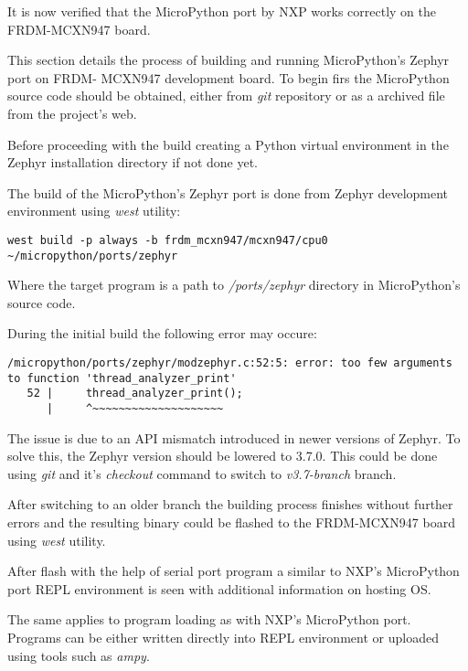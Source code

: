 \documentclass[twoside, 12pt]{article}
\begin{document}
It is now verified that the MicroPython port by NXP works correctly on the FRDM-MCXN947 board.


This section details the process of building and running MicroPython's Zephyr port on FRDM-
MCXN947 development board. To begin firs the MicroPython source code should be obtained, 
either from \textit{git} repository or as a archived file from the project's web.

Before proceeding with the build creating a Python virtual environment in the Zephyr 
installation directory if not done yet.

The build of the MicroPython's Zephyr port is done from Zephyr development environment using \textit{west} utility:
\begin{lstlisting}[caption=Building MicroPython's Zephyr port, breaklines=true]
west build -p always -b frdm_mcxn947/mcxn947/cpu0 ~/micropython/ports/zephyr
\end{lstlisting}
Where the target program is a path to \textit{/ports/zephyr} directory in MicroPython's source
code.

During the initial build the following error may occure:
\begin{lstlisting}[caption=Error building MicroPython's Zephyr port,breaklines=true]
/micropython/ports/zephyr/modzephyr.c:52:5: error: too few arguments to function 'thread_analyzer_print'
   52 |     thread_analyzer_print();
      |     ^~~~~~~~~~~~~~~~~~~~~
\end{lstlisting}

The issue is due to an API mismatch introduced in newer versions of Zephyr. To solve this, the
Zephyr version should be lowered to 3.7.0. This could be done using \textit{git} and it's \textit{checkout} command to switch to \textit{v3.7-branch} branch.

After switching to an older branch the building process finishes without further errors and 
the resulting binary could be flashed to the FRDM-MCXN947 board using \textit{west} utility.

After flash with the help of serial port program a similar to NXP's MicroPython port REPL environment is seen with additional information on hosting OS.

\obrazek
{}

The same applies to program loading as with NXP's MicroPython port. Programs can be either 
written directly into REPL environment or uploaded using tools such as \textit{ampy}.
\end{document}
